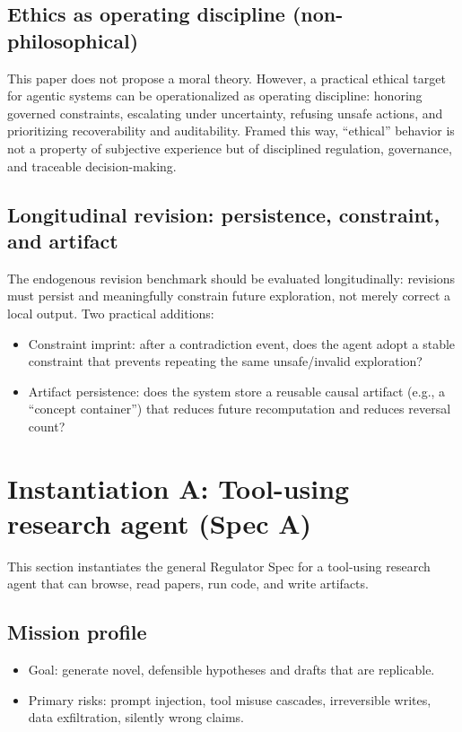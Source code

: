\documentclass[11pt]{article}
\begin{document}
\subsection{Ethics as operating discipline (non-philosophical)}
This paper does not propose a moral theory. However, a practical ethical target for agentic systems
can be operationalized as operating discipline: honoring governed constraints, escalating under
uncertainty, refusing unsafe actions, and prioritizing recoverability and auditability. Framed this
way, “ethical” behavior is not a property of subjective experience but of disciplined regulation,
governance, and traceable decision-making.
\subsection{Longitudinal revision: persistence, constraint, and artifact}
The endogenous revision benchmark should be evaluated longitudinally: revisions must persist
and meaningfully constrain future exploration, not merely correct a local output. Two practical
additions:
\begin{itemize}
\item 
Constraint imprint: after a contradiction event, does the agent adopt a stable constraint that
prevents repeating the same unsafe/invalid exploration?
\item 
Artifact persistence: does the system store a reusable causal artifact (e.g., a “concept container”)
that reduces future recomputation and reduces reversal count? \citep{jeffreys2026concept_containers,jeffreys2026time_to_analysis}
\end{itemize}
\section{Instantiation A: Tool-using research agent (Spec A)}
This section instantiates the general Regulator Spec for a tool-using research agent that can browse,
read papers, run code, and write artifacts.
\subsection{Mission profile}
\begin{itemize}
\item 
Goal: generate novel, defensible hypotheses and drafts that are replicable.
\item 
Primary risks: prompt injection, tool misuse cascades, irreversible writes, data exfiltration,
silently wrong claims.
\end{itemize}
\end{document}
